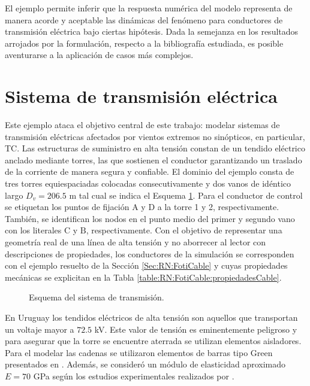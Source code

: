 El ejemplo permite inferir que la respuesta numérica del modelo representa de manera acorde y aceptable las dinámicas del fenómeno para conductores de transmisión eléctrica bajo ciertas hipótesis. Dada la semejanza en los resultados arrojados por la formulación, respecto a la bibliografía estudiada, es posible aventurarse a la aplicación de casos más complejos. 



\section{Sistema de transmisión eléctrica }\label{Sec:RN:TransmissionSystem}
Este ejemplo ataca el objetivo central de este trabajo: modelar sistemas de transmisión eléctricas afectados por vientos extremos no sinópticos, en particular, TC. Las estructuras de suministro en alta tensión constan de un tendido eléctrico anclado mediante torres, las que sostienen el conductor garantizando un traslado de la corriente de manera segura y confiable. El dominio del ejemplo consta de tres torres equiespaciadas colocadas consecutivamente y dos vanos de idéntico largo $D_v= 206.5$ m tal cual se indica el Esquema \ref{fig:Transmission:EsquemaGeneral}.  Para el conductor de control se etiquetan los puntos de fijación $\text{A}$ y $\text{D}$ a la torre 1 y 2, respectivamente. También, se identifican los nodos en el punto medio del primer y segundo vano con los literales $\text{C}$ y $\text{B}$, respectivamente. Con el objetivo de representar una geometría real de una línea de alta tensión y no aborrecer al lector con descripciones de propiedades, los conductores de la simulación se corresponden con el ejemplo resuelto de la Sección \ref{Sec:RN:FotiCable} y cuyas propiedades mecánicas se explicitan en la Tabla \ref{table:RN:FotiCable:propiedadesCable}.  


\begin{figure}[htbp]
	\centering
	\def\svgwidth{120mm}
	
	\caption{Esquema del sistema de transmisión.}
	\label{fig:Transmission:EsquemaGeneral}
\end{figure}

En Uruguay los tendidos eléctricos de alta tensión son aquellos que transportan un voltaje mayor a $72.5$ kV. Este valor de tensión es eminentemente peligroso y para asegurar que la torre se encuentre aterrada se utilizan elementos aisladores. Para el modelar las cadenas se utilizaron elementos de barras tipo Green presentados en \citep{Crisfield}. Además, se consideró un módulo de elasticidad aproximado $E = 70$ GPa según los estudios experimentales realizados por  \cite{MoralesAisladores}.


